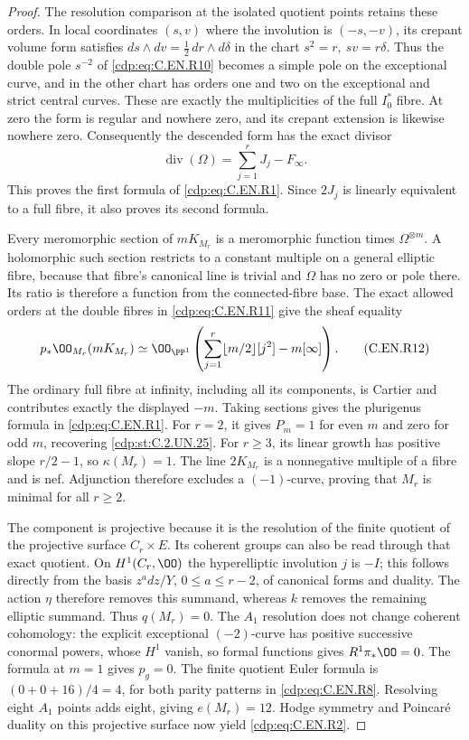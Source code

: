 \begin{proof}
The resolution comparison at the isolated
quotient points retains these orders.
In local coordinates $(s,v)$ where the
involution is $(-s,-v)$, its crepant
volume form satisfies
$ds\wedge dv=\tfrac12\,dr\wedge d\delta$
in the chart $s^2=r,\ sv=r\delta$.
Thus the double pole $s^{-2}$ of
\eqref{cdp:eq:C.EN.R10} becomes a simple pole
on the exceptional curve, and in the
other chart has orders one and two
on the exceptional and strict central
curves. These are exactly the
multiplicities of the full $I_0^*$
fibre. At zero the form is regular
and nowhere zero, and its crepant
extension is likewise nowhere zero.
Consequently the descended form has
the exact divisor
\[
                \operatorname{div}(\Omega)
                         =\sum_{j=1}^r J_j-F_\infty.
                                                               \tag{C.EN.R11}\label{cdp:eq:C.EN.R11}
\]
This proves the first formula of
\eqref{cdp:eq:C.EN.R1}. Since $2J_j$ is linearly
equivalent to a full fibre, it also
proves its second formula.

Every meromorphic section of $mK_{M_r}$
is a meromorphic function times
$\Omega^{\otimes m}$. A holomorphic
such section restricts to a constant
multiple on a general elliptic fibre,
because that fibre's canonical line
is trivial and $\Omega$ has no zero
or pole there. Its ratio is therefore
a function from the connected-fibre
base. The exact allowed orders at
the double fibres in \eqref{cdp:eq:C.EN.R11}
give the sheaf equality
\[
 p_*\OO_{M_r}(mK_{M_r})
  \simeq
 \OO_{\PP^1}\left(
      \sum_{j=1}^r\lfloor m/2\rfloor[j^2]
                       -m[\infty]\right).
                                                               \tag{C.EN.R12}\label{cdp:eq:C.EN.R12}
\]
The ordinary full fibre at infinity,
including all its components, is
Cartier and contributes exactly the
displayed $-m$. Taking sections gives
the plurigenus formula in \eqref{cdp:eq:C.EN.R1}.
For $r=2$, it gives $P_m=1$ for even
$m$ and zero for odd $m$, recovering
\ref{cdp:st:C.2.UN.25}. For $r\ge3$, its linear growth
has positive slope $r/2-1$, so
$\kappa(M_r)=1$. The line $2K_{M_r}$
is a nonnegative multiple of a fibre
and is nef. Adjunction therefore
excludes a $(-1)$-curve, proving that
$M_r$ is minimal for all $r\ge2$.

The component is projective because
it is the resolution of the finite
quotient of the projective surface
$C_r\times E$. Its coherent groups
can also be read through that exact
quotient. On $H^1(C_r,\OO)$ the
hyperelliptic involution $j$ is
$-I$; this follows directly from
the basis $z^a dz/Y$, $0\le a\le r-2$,
of canonical forms and duality.
The action $\eta$ therefore removes
this summand, whereas $k$ removes
the remaining elliptic summand.
Thus $q(M_r)=0$. The $A_1$ resolution
does not change coherent cohomology:
the explicit exceptional $(-2)$-curve
has positive successive conormal
powers, whose $H^1$ vanish, so
formal functions gives $R^1\pi_*\OO=0$.
The formula at $m=1$ gives $p_g=0$.
The finite quotient Euler formula is
$(0+0+16)/4=4$, for both parity
patterns in \eqref{cdp:eq:C.EN.R8}. Resolving
eight $A_1$ points adds eight,
giving $e(M_r)=12$. Hodge symmetry
and Poincar\'e duality on this
projective surface now yield
\eqref{cdp:eq:C.EN.R2}.


\end{proof}
